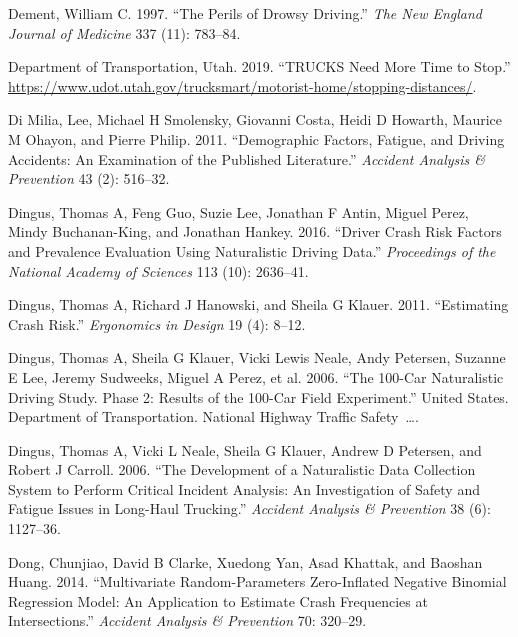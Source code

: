 \documentclass[12pt]{book}
\numberwithin{equation}{chapter}
\begin{document}
\leavevmode\hypertarget{ref-dement1997perils}{}%
Dement, William C. 1997. ``The Perils of Drowsy Driving.'' \emph{The New England Journal of Medicine} 337 (11): 783--84.

\leavevmode\hypertarget{ref-utah2019}{}%
Department of Transportation, Utah. 2019. ``TRUCKS Need More Time to Stop.'' \url{https://www.udot.utah.gov/trucksmart/motorist-home/stopping-distances/}.

\leavevmode\hypertarget{ref-di2011demographic}{}%
Di Milia, Lee, Michael H Smolensky, Giovanni Costa, Heidi D Howarth, Maurice M Ohayon, and Pierre Philip. 2011. ``Demographic Factors, Fatigue, and Driving Accidents: An Examination of the Published Literature.'' \emph{Accident Analysis \& Prevention} 43 (2): 516--32.

\leavevmode\hypertarget{ref-dingus2016driver}{}%
Dingus, Thomas A, Feng Guo, Suzie Lee, Jonathan F Antin, Miguel Perez, Mindy Buchanan-King, and Jonathan Hankey. 2016. ``Driver Crash Risk Factors and Prevalence Evaluation Using Naturalistic Driving Data.'' \emph{Proceedings of the National Academy of Sciences} 113 (10): 2636--41.

\leavevmode\hypertarget{ref-dingus2011estimating}{}%
Dingus, Thomas A, Richard J Hanowski, and Sheila G Klauer. 2011. ``Estimating Crash Risk.'' \emph{Ergonomics in Design} 19 (4): 8--12.

\leavevmode\hypertarget{ref-dingus2006100}{}%
Dingus, Thomas A, Sheila G Klauer, Vicki Lewis Neale, Andy Petersen, Suzanne E Lee, Jeremy Sudweeks, Miguel A Perez, et al. 2006. ``The 100-Car Naturalistic Driving Study. Phase 2: Results of the 100-Car Field Experiment.'' United States. Department of Transportation. National Highway Traffic Safety~\ldots{}.

\leavevmode\hypertarget{ref-dingus2006development}{}%
Dingus, Thomas A, Vicki L Neale, Sheila G Klauer, Andrew D Petersen, and Robert J Carroll. 2006. ``The Development of a Naturalistic Data Collection System to Perform Critical Incident Analysis: An Investigation of Safety and Fatigue Issues in Long-Haul Trucking.'' \emph{Accident Analysis \& Prevention} 38 (6): 1127--36.

\leavevmode\hypertarget{ref-dong2014multivariate}{}%
Dong, Chunjiao, David B Clarke, Xuedong Yan, Asad Khattak, and Baoshan Huang. 2014. ``Multivariate Random-Parameters Zero-Inflated Negative Binomial Regression Model: An Application to Estimate Crash Frequencies at Intersections.'' \emph{Accident Analysis \& Prevention} 70: 320--29.
\end{document}
